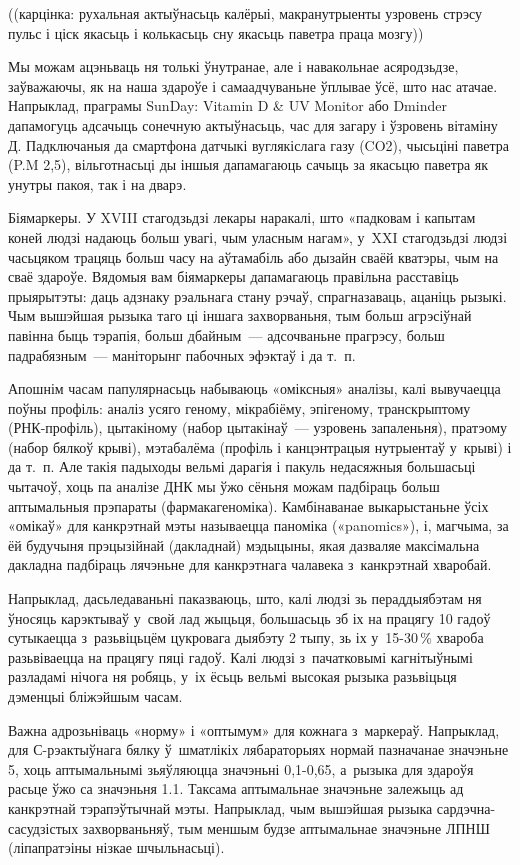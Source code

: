 ((карцінка: рухальная актыўнасьць калёрыі, макранутрыенты узровень стрэсу пульс і ціск якасьць і колькасьць сну якасьць паветра праца мозгу))

Мы можам ацэньваць ня толькі ўнутранае, але і навакольнае асяродзьдзе, заўважаючы, як на наша здароўе і самаадчуваньне ўплывае ўсё, што нас атачае. Напрыклад, праграмы SunDay: Vitamin D \& UV Monitor або Dminder дапамогуць адсачыць сонечную актыўнасьць, час для загару і ўзровень вітаміну Д. Падключаныя да смартфона датчыкі вуглякіслага газу (CO2), чысьціні паветра (P.M 2,5), вільготнасьці ды іншыя дапамагаюць сачыць за якасьцю паветра як унутры пакоя, так і на дварэ.

Біямаркеры. У XVIII стагодзьдзі лекары наракалі, што «падковам і капытам коней людзі надаюць больш увагі, чым уласным нагам», у~XXI стагодзьдзі людзі часьцяком трацяць больш часу на аўтамабіль або дызайн сваёй кватэры, чым на сваё здароўе. Вядомыя вам біямаркеры дапамагаюць правільна расставіць прыярытэты: даць адзнаку рэальнага стану рэчаў, спрагназаваць, ацаніць рызыкі. Чым вышэйшая рызыка таго ці іншага захворваньня, тым больш агрэсіўнай павінна быць тэрапія, больш дбайным~--- адсочваньне прагрэсу, больш падрабязным~--- маніторынг пабочных эфэктаў і да т.~п.

Апошнім часам папулярнасьць набываюць «оміксныя» аналізы, калі вывучаецца поўны профіль: аналіз усяго геному, мікрабіёму, эпігеному, транскрыптому (РНК-профіль), цытакіному (набор цытакінаў~--- узровень запаленьня), пратэому (набор бялкоў крыві), мэтабалёма (профіль і канцэнтрацыя нутрыентаў у~крыві) і да т.~п. Але такія падыходы вельмі дарагія і пакуль недасяжныя большасьці чытачоў, хоць па аналізе ДНК мы ўжо сёньня можам падбіраць больш аптымальныя прэпараты (фармакагеноміка). Камбінаванае выкарыстаньне ўсіх «омікаў» для канкрэтнай мэты называецца паноміка («panomics»), і, магчыма, за ёй будучыня прэцызійнай (дакладнай) мэдыцыны, якая дазваляе максімальна дакладна падбіраць лячэньне для канкрэтнага чалавека з~канкрэтнай хваробай.

Напрыклад, дасьледаваньні паказваюць, што, калі людзі зь пераддыябэтам ня ўносяць карэктываў у~свой лад жыцьця, большасьць зб іх на працягу 10 гадоў сутыкаецца з~разьвіцьцём цукровага дыябэту 2 тыпу, зь іх у~15-30\,\% хвароба разьвіваецца на працягу пяці гадоў. Калі людзі з~пачатковымі кагнітыўнымі разладамі нічога ня робяць, у~іх ёсьць вельмі высокая рызыка разьвіцьця дэменцыі бліжэйшым часам.

Важна адрозьніваць «норму» і «оптымум» для кожнага з~маркераў. Напрыклад, для С-рэактыўнага бялку ў~шматлікіх лябараторыях нормай пазначанае значэньне 5, хоць аптымальнымі зьяўляюцца значэньні 0,1-0,65, а~рызыка для здароўя расьце ўжо са значэньня 1.1. Таксама аптымальнае значэньне залежыць ад канкрэтнай тэрапэўтычнай мэты. Напрыклад, чым вышэйшая рызыка сардэчна-сасудзістых захворваньняў, тым меншым будзе аптымальнае значэньне ЛПНШ (ліпапратэіны нізкае шчыльнасьці).

